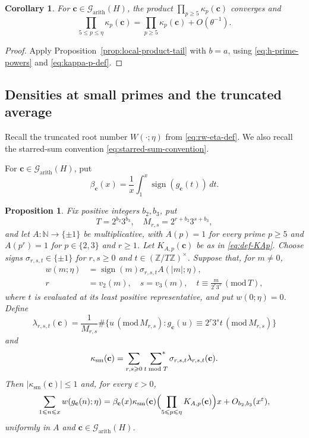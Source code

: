 \documentclass[12pt,reqno]{amsart}
\numberwithin{equation}{section}
\newtheorem{proposition}[theorem]{Proposition}
\newtheorem{corollary}[theorem]{Corollary}
\theoremstyle{definition}
\renewcommand{\le}{\leqslant}
\renewcommand{\ge}{\geqslant}
\newcommand{\sumstar}{\sideset{}{^*}\sum}
\newcommand{\ZZ}{\mathbb{Z}}
\newcommand{\NN}{\mathbb{N}}
\newcommand{\cc}{\mathbf{c}}
\DeclareMathOperator{\sign}{sign}
\newcommand{\rw}{W}
\renewcommand{\pmod}[1]{\,(\mathrm{mod}\,#1)}
\begin{document}
\begin{corollary}\label{cor:kappa-tail}
For $\cc\in\mathcal G_{\mathrm{arith}}(H)$, the product $\prod_{p\ge5}\kappa_p(\cc)$ converges and
\begin{equation}\label{eq:kappa-trunc-full}
\prod_{5\le p\le\eta}\kappa_p(\cc)
=\prod_{p\ge5}\kappa_p(\cc)+O(\theta^{-1}).
\end{equation}
\end{corollary}

\begin{proof}
Apply Proposition~\ref{prop:local-product-tail} with $b=a$, using \eqref{eq:h-prime-powers} and \eqref{eq:kappa-p-def}.
\end{proof}

\subsection{Densities at small primes and the truncated average}

Recall the truncated root number $\rw(\cdot;\eta)$ from \eqref{eq:rw-eta-def}.
We also recall the starred-sum convention \eqref{eq:starred-sum-convention}.

For $\cc\in\mathcal G_{\mathrm{arith}}(H)$, put
\begin{equation}\label{eq:beta-c-def}
\beta_\cc(x)=\frac1x\int_1^x\sign(g_\cc(t))\,dt.
\end{equation}

\begin{proposition}\label{prop:cell-average}
Fix positive integers $b_2,b_3$, put
\[
T=2^{b_2}3^{b_3},\quad M_{r,s}=2^{r+b_2}3^{s+b_3},
\]
and let $A:\NN\to\{\pm1\}$ be multiplicative, with $A(p)=1$ for every prime $p\ge5$ and $A(p^r)=1$ for $p\in\{2,3\}$ and $r\ge1$.
Let $K_{A,p}(\cc)$ be as in \eqref{eq:def-KAp}.
Choose signs $\sigma_{r,s,t}\in\{\pm1\}$ for $r,s\ge0$ and $t\in(\ZZ/T\ZZ)^\times$.
Suppose that, for $m\ne0$,
\begin{equation}\label{eq:cell-law}
\begin{aligned}
w(m;\eta)&=\sign(m)\sigma_{r,s,t}A(|m|;\eta),\\
r&=v_2(m),\quad s=v_3(m),\quad
t\equiv\frac{m}{2^r3^s}\pmod T,
\end{aligned}
\end{equation}
where $t$ is evaluated at its least positive representative, and put $w(0;\eta)=0$.
Define
\[
\lambda_{r,s,t}(\cc)
=\frac1{M_{r,s}}\#\{u\pmod{M_{r,s}}:
g_\cc(u)\equiv2^r3^s t\pmod{M_{r,s}}\}
\]
and
\[
\kappa_{\mathrm{sm}}(\cc)
=\sum_{r,s\ge0}\ \sumstar_{t\bmod T}
\sigma_{r,s,t}\lambda_{r,s,t}(\cc).
\]
Then $|\kappa_{\mathrm{sm}}(\cc)|\le1$ and, for every $\varepsilon>0$,
\[
\sum_{1\le n\le x}w(g_\cc(n);\eta)
=\beta_\cc(x)\kappa_{\mathrm{sm}}(\cc)
\Bigl(\prod_{5\le p\le\eta}K_{A,p}(\cc)\Bigr)x
+O_{b_2,b_3}(x^\varepsilon),
\]
uniformly in $A$ and $\cc\in\mathcal G_{\mathrm{arith}}(H)$.
\end{proposition}
\end{document}
